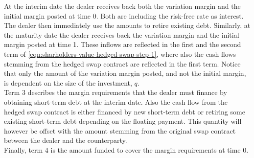 \documentclass[main.tex]{subfiles}
\begin{document}
        At the interim date the dealer receives back both the variation margin and the initial margin posted at time 0.
        Both are including the risk-free rate as interest.
        The dealer then immediately use the amounts to retire existing debt.
        Similarly, at the maturity date the dealer receives back the variation margin and the initial margin posted at time 1.
        These inflows are reflected in the first and the second term of \cref{eqn:sharholders-value-hedged-swap-step-1},
        where also the cash flows stemming from the hedged swap contract are reflected in the first term.
        Notice that only the amount of the variation margin posted,
        and not the initial margin,
        is dependent on the size of the investment, $q$.
        \\
        Term 3 describes the margin requirements that the dealer must finance by obtaining short-term debt at the interim date.
        Also the cash flow from the hedged swap contract is either financed by new short-term debt or retiring some existing short-term debt depending on the floating payment.
        This quantity will however be offset with the amount stemming from the original swap contract between the dealer and the counterparty.
        \\
        Finally, term 4 is the amount funded to cover the margin requirements at time 0.
\end{document}

